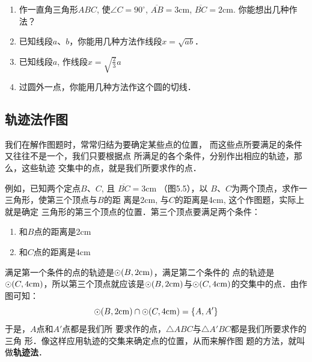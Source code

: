 \begin{ex}
\begin{enumerate}
    \item 作一直角三角形$ABC$, 使$\angle C=90^{\circ}$, $\overline{AB}=3$cm, $\overline{BC}=
    2$cm. 你能想出几种作法？
    \item 已知线段$a$、$b$，你能用几种方法作线段$x=\sqrt{ab}$．
    \item 已知线段$a$, 作线段$x=\sqrt{\frac{2}{3}}a$
        \item 过圆外一点，你能用几种方法作这个圆的切线．
\end{enumerate}
\end{ex}

\subsection{轨迹法作图}
我们在解作图题时，常常归结为要确定某些点的位置，
而这些点所要满足的条件又往往不是一个，我们只要根据点
所满足的各个条件，分别作出相应的轨迹，那么，这些轨迹
交集中的点，就是我们所要求作的点．

例如，已知两个定点$B$、$C$, 且
$\overline{BC}=3$cm （图5.5），以
$B$、$C$为两个顶点，求作一三角形，使第三个顶点与$B$的距
离是2cm, 与$C$的距离是4cm, 这个作图题，实际上就是确定
三角形的第三个顶点的位置．第三个顶点要满足两个条件：
\begin{enumerate}
    \item 和$B$点的距离是2cm
    \item 和$C$点的距离是4cm
\end{enumerate}
满足第一个条件的点的轨迹是$\odot(B,2{\rm cm})$，满足第二个条件的
点的轨迹是$\odot (C,4{\rm cm})$，所以第三个顶点就应该是$\odot(B,2{\rm cm})$与$\odot (C,4{\rm cm})$的交集中的点．由作图可知：
\[\odot(B,2{\rm cm})\cap \odot (C,4{\rm cm})=\{A, A'\}\]
于是，$A$点和$A'$点都是我们所
要求作的点，$\triangle ABC$与$\triangle A'BC$都是我们所要求作的三角
形．像这样应用轨迹的交集来确定点的位置，从而来解作图
题的方法，就叫做\textbf{轨迹法}．

